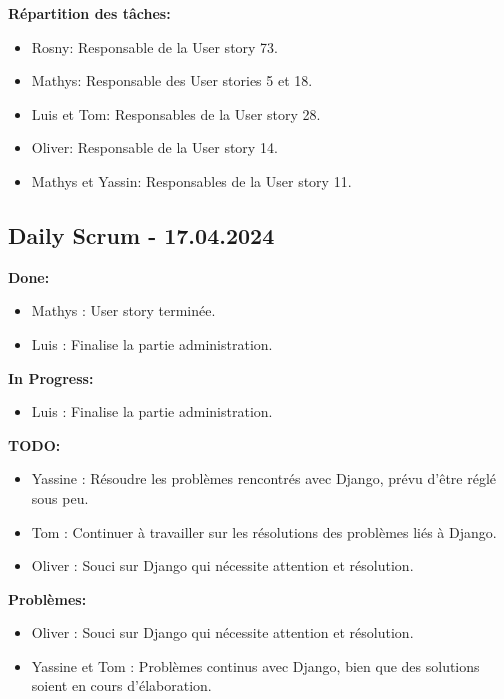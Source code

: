 \documentclass[11pt]{article}
\begin{document}
\textbf{Répartition des tâches:}
\begin{itemize}
    \item Rosny: Responsable de la User story 73.
    \item Mathys: Responsable des User stories 5 et 18.
    \item Luis et Tom: Responsables de la User story 28.
    \item Oliver: Responsable de la User story 14.
    \item Mathys et Yassin: Responsables de la User story 11.
\end{itemize}




\subsection*{{\color{navy}Daily Scrum - 17.04.2024}}

\textbf{Done:}
\begin{itemize}
  \item Mathys : User story terminée.
  \item Luis : Finalise la partie administration.
\end{itemize}

\textbf{In Progress:}
\begin{itemize}
  \item Luis : Finalise la partie administration.
\end{itemize}

\textbf{TODO:}
\begin{itemize}
  \item Yassine : Résoudre les problèmes rencontrés avec Django, prévu d'être réglé sous peu.
  \item Tom : Continuer à travailler sur les résolutions des problèmes liés à Django.
  \item Oliver : Souci sur Django qui nécessite attention et résolution.
\end{itemize}

\textbf{Problèmes:}
\begin{itemize}
  \item Oliver : Souci sur Django qui nécessite attention et résolution.
  \item Yassine et Tom : Problèmes continus avec Django, bien que des solutions soient en cours d'élaboration.
\end{itemize}
\end{document}
